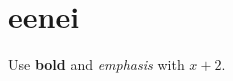 \documentclass{article}
\begin{document}
\section{eenei}
Use \textbf{bold} and \emph{emphasis} with $x + 2$.
\end{document}
